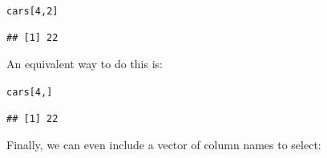 \begin{knitrout}
\color{fgcolor}\begin{kframe}
\begin{alltt}
cars[4, 2]
\end{alltt}
\begin{verbatim}
## [1] 22
\end{verbatim}
\end{kframe}
\end{knitrout}


\noindent An equivalent way to do this is:

\begin{knitrout}
\color{fgcolor}\begin{kframe}
\begin{alltt}
cars[4, ]
\end{alltt}
\begin{verbatim}
## [1] 22
\end{verbatim}
\end{kframe}
\end{knitrout}


Finally, we can even include a vector of column names to select:













































